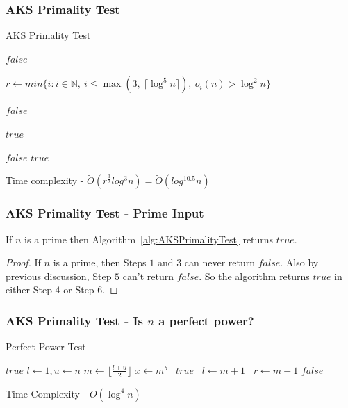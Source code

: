 \documentclass{beamer}
\begin{document}
\begin{frame}
\frametitle{AKS Primality Test}
\begin{algorithm}[H]
\caption{AKS Primality Test}
\label{alg:AKSPrimalityTest}
\begin{algorithmic}

	\State \Return $false$  
\EndIf

\State $r \gets min \{i: i \in \mathbb{N},\ i \leq \max(3,\ \lceil \log^5 n \rceil),\ o_i(n) > \log^2 n \}$ 

		\State \Return $false$  
	\EndIf
\EndFor

	\Return $true$  
\EndIf

		\State \Return $false$  
	\EndIf
\EndFor
\State \Return $true$ 
\EndProcedure
\end{algorithmic}
\end{algorithm}
Time complexity - $\tilde O(r^\frac{3}{2}log^3 n) = \tilde O(log^{10.5} n)$
\end{frame}

\begin{frame}
\frametitle{AKS Primality Test - Prime Input}
\begin{lemma}
\label{lemma:AKSLemma1}
If $n$ is a prime then Algorithm~\ref{alg:AKSPrimalityTest} returns $true$.
\end{lemma}
\begin{proof}
If $n$ is a prime, then Steps $1$ and $3$ can never return $false$. Also by previous discussion, Step $5$ can't return $false$. So the algorithm returns $true$ in either Step $4$ or Step $6$.
\end{proof}
\end{frame}

\begin{frame}
\frametitle{AKS Primality Test - Is $n$ a perfect power?}
\begin{algorithm}[H]
\caption{Perfect Power Test}
\label{alg:PerfectPowerTest}
\begin{algorithmic}
	\State \Return $true$
\EndIf
{}
	\State $l \gets 1, u \gets n$
		\State $m \gets \lfloor \frac{l+u}{2} \rfloor$
		\State $x \gets m^b$ 
			\ \Return $true$
			\ $l \gets m+1$
		\Else
			\ $r \gets m-1$
		\EndIf
	\EndWhile
\EndFor
\State \Return $false$
\EndProcedure
\end{algorithmic}
\end{algorithm}
Time Complexity - $O(\log^4 n)$
\end{frame}
\end{document}
